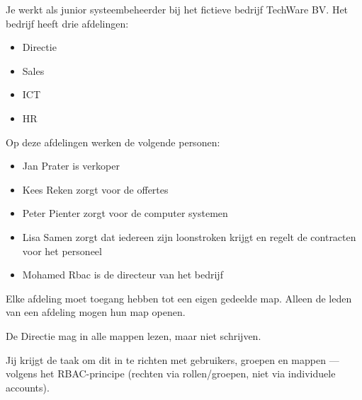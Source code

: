 Je werkt als junior systeembeheerder bij het fictieve bedrijf TechWare BV. Het bedrijf heeft drie afdelingen:
\begin{itemize}
\item Directie
\item Sales
\item ICT
\item HR
\end{itemize}
Op deze afdelingen werken de volgende personen:
\begin{itemize}
\item Jan Prater is verkoper
\item Kees Reken zorgt voor de offertes
\item Peter Pienter zorgt voor de computer systemen
\item Lisa Samen zorgt dat iedereen zijn loonstroken krijgt en regelt de contracten voor het personeel
\item Mohamed Rbac is de directeur van het bedrijf
\end{itemize}

Elke afdeling moet toegang hebben tot een eigen gedeelde map. Alleen de leden van een afdeling mogen hun map openen.

De Directie mag in alle mappen lezen, maar niet schrijven.

Jij krijgt de taak om dit in te richten met gebruikers, groepen en mappen — volgens het RBAC-principe (rechten via rollen/groepen, niet via individuele accounts).

